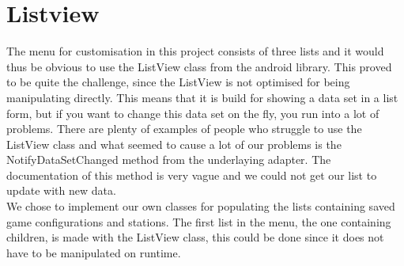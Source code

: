 
\section{Listview}
The menu for customisation in this project consists of three lists and it would thus be obvious to use the ListView class from the android library\citep{androidlistview}. This proved to be quite the challenge, since the ListView is not optimised for being manipulating directly. This means that it is build for showing a data set in a list form, but if you want to change this data set on the fly, you run into a lot of problems. There are plenty of examples of people who struggle to use the ListView class\citep{listviewfail} and what seemed to cause a lot of our problems is the NotifyDataSetChanged method from the underlaying adapter\citep{notifydatasetchanged}. The documentation of this method is very vague and we could not get our list to update with new data.\\
We chose to implement our own classes for populating the lists containing saved game configurations and stations. The first list in the menu, the one containing children, is made with the ListView class, this could be done since it does not have to be manipulated on runtime.
